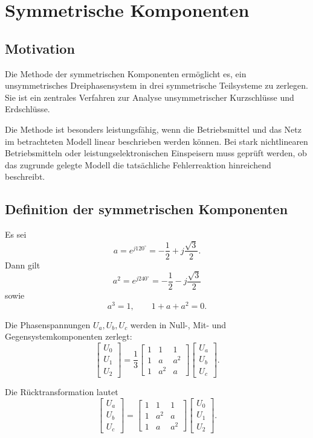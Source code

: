 \chapter{Symmetrische Komponenten}
\label{chap:07-symmetrische-komponenten}

\section{Motivation}

Die Methode der symmetrischen Komponenten ermöglicht es, ein unsymmetrisches
Dreiphasensystem in drei symmetrische Teilsysteme zu zerlegen. Sie ist ein
zentrales Verfahren zur Analyse unsymmetrischer Kurzschlüsse und Erdschlüsse.

Die Methode ist besonders leistungsfähig, wenn die Betriebsmittel und das
Netz im betrachteten Modell linear beschrieben werden können. Bei stark
nichtlinearen Betriebsmitteln oder leistungselektronischen Einspeisern muss
geprüft werden, ob das zugrunde gelegte Modell die tatsächliche Fehlerreaktion
hinreichend beschreibt.

\section{Definition der symmetrischen Komponenten}

Es sei
\[
  a=e^{j120^\circ}
  =-\frac12+j\frac{\sqrt{3}}{2}.
\]
Dann gilt
\[
  a^2=e^{j240^\circ}
  =-\frac12-j\frac{\sqrt{3}}{2}
\]
sowie
\[
  a^3=1,\qquad 1+a+a^2=0.
\]

Die Phasenspannungen \(U_a,U_b,U_c\) werden in Null-, Mit- und
Gegensystemkomponenten zerlegt:
\[
  \begin{bmatrix}
    U_0\\
    U_1\\
    U_2
  \end{bmatrix}
  =
  \frac13
  \begin{bmatrix}
    1&1&1\\
    1&a&a^2\\
    1&a^2&a
  \end{bmatrix}
  \begin{bmatrix}
    U_a\\
    U_b\\
    U_c
  \end{bmatrix}.
\]

Die Rücktransformation lautet
\[
  \begin{bmatrix}
    U_a\\
    U_b\\
    U_c
  \end{bmatrix}
  =
  \begin{bmatrix}
    1&1&1\\
    1&a^2&a\\
    1&a&a^2
  \end{bmatrix}
  \begin{bmatrix}
    U_0\\
    U_1\\
    U_2
  \end{bmatrix}.
\]

